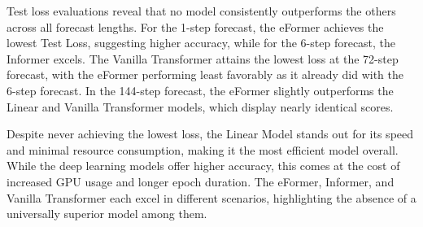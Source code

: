 \documentclass{article}
\begin{document}
Test loss evaluations reveal that no model consistently outperforms the others across all forecast lengths. For the 1-step forecast, the eFormer achieves the lowest Test Loss, suggesting higher accuracy, while for the 6-step forecast, the Informer excels. The Vanilla Transformer attains the lowest loss at the 72-step forecast, with the eFormer performing least favorably as it already did with the 6-step forecast. In the 144-step forecast, the eFormer slightly outperforms the Linear and Vanilla Transformer models, which display nearly identical scores.

Despite never achieving the lowest loss, the Linear Model stands out for its speed and minimal resource consumption, making it the most efficient model overall. While the deep learning models offer higher accuracy, this comes at the cost of increased GPU usage and longer epoch duration. The eFormer, Informer, and Vanilla Transformer each excel in different scenarios, highlighting the absence of a universally superior model among them.
\end{document}
